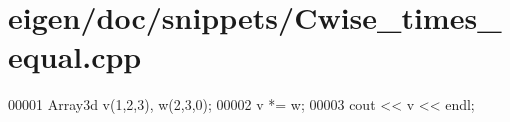 \hypertarget{eigen_2doc_2snippets_2_cwise__times__equal_8cpp_source}{}\section{eigen/doc/snippets/\+Cwise\+\_\+times\+\_\+equal.cpp}
\label{eigen_2doc_2snippets_2_cwise__times__equal_8cpp_source}

\begin{DoxyCode}
00001 Array3d v(1,2,3), w(2,3,0);
00002 v *= w;
00003 cout << v << endl;
\end{DoxyCode}
